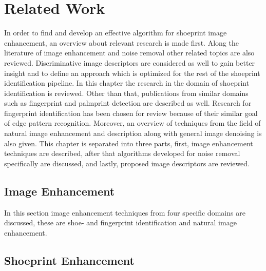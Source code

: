 \documentclass[draft,final]{vutinfth} %
\begin{document}
\chapter{Related Work}
\par
In order to find and develop an effective algorithm for shoeprint image enhancement, an overview about relevant research is made first.
Along the literature of image enhancement and noise removal other related topics are also reviewed.
Discriminative image descriptors are considered as well to gain better insight and to define an approach which is optimized for the rest of the shoeprint identification pipeline.
In this chapter the research in the domain of shoeprint identification is reviewed.
Other than that, publications from similar domains such as fingerprint and palmprint detection are described as well.
Research for fingerprint identification has been chosen for review because of their similar goal of edge pattern recognition.
Moreover, an overview of techniques from the field of natural image enhancement and description along with general image denoising is also given.
This chapter is separated into three parts, first, image enhancement techniques are described, after that algorithms developed for noise removal specifically are discussed, and lastly, proposed image descriptors are reviewed.


\section{Image Enhancement}
\label{sec:rw:ImageENhancement}

In this section image enhancement techniques from four specific domains are discussed, these are shoe- and fingerprint identification and natural image enhancement.

\section*{Shoeprint Enhancement}
\end{document}
